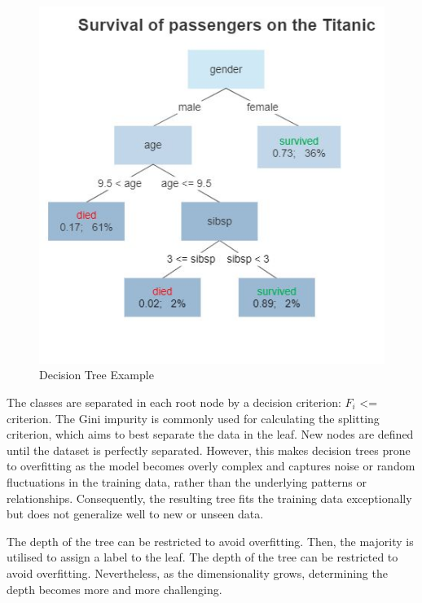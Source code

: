\begin{figure}[H]
	\centering
	\includegraphics[width=150mm]{figs/decision_tree}
	\caption[Decision Tree Example]{Decision Tree Example} 
	\label{fig:Decision_tree}
\end{figure}

The classes are separated in each root node by a decision criterion: $F_i$ <= criterion. The Gini impurity is commonly used for calculating the splitting criterion, which aims to best separate the data in the leaf. New nodes are defined until the dataset is perfectly separated. However, this makes decision trees prone to overfitting as the model becomes overly complex and captures noise or random fluctuations in the training data, rather than the underlying patterns or relationships. Consequently, the resulting tree fits the training data exceptionally but does not generalize well to new or unseen data. 

The depth of the tree can be restricted to avoid overfitting. Then, the majority is utilised to assign a label to the leaf. The depth of the tree can be restricted to avoid overfitting. Nevertheless, as the dimensionality grows, determining the depth becomes more and more challenging.

